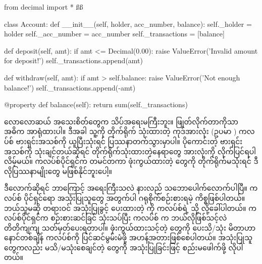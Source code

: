 %
\begin{py} 
from decimal import * ß\label{ch09:txntobal}ß

class Account:
    def __init__(self, holder, acc_number, balance):
        self._holder = holder
        self._acc_number = acc_number
        self._transactions = [balance]

    def deposit(self, amt):
        if amt <= Decimal(0.00):
            raise ValueError('Invalid amount for deposit!')
        self._transactions.append(amt)

    def withdraw(self, amt):
        if amt > self.balance:
            raise ValueError('Not enough balance!')
        self._transactions.append(-amt)

    @property
    def balance(self):
        return sum(self._transactions)
\end{py}
လောလောဆယ် အသေးစိတ်တွေက သိပ်အရေးမကြီးဘူး။  ဖြုတ်လိုက်တာကိုသာ အဓိက အာ\allowbreak ရုံထားပါ။ ဒီအခါ သူ့ကို တိုက်ရိုက် သုံးထားတဲ့ ကုဒ်အားလုံး (ဥပမာ ) ကလပ်စ် ဗားရှင်းအသစ်ကို  ယူပြီးသုံးရင်  ပြဿနာတက်သွားမှာပါ။ ပိုကောင်းတဲ့ ဗားရှင်းအသစ်ကို သုံးချင်တယ်ဆိုရင် တိုက်ရိုက်သုံးထားတဲ့နေရာတွေ အားလုံးကို လိုက်ပြင်ရပါလိမ့်မယ်။ ကလပ်စ်ပိုင်ရှင်က တမင်တကာ ဖုံးကွယ်ထားတဲ့  တွေကို တိုက်ရိုက်မသုံးရင် ဒီလိုပြဿနာမျိုးတွေ မဖြစ်နိုင်ဘူးပေါ့။

ဒီလောက်ဆိုရင်  ဘာကြောင့် အရေးကြီးသလဲ နားလည် သဘောပေါက်လောက်ပါပြီ။ ကလပ်စ် ပိုင်ရှင်ရော အသုံးပြုသူတွေ အတွက်ပါ ဂရုစိုက်စဉ်းစားရမဲ့ ကိစ္စဖြစ်ပါတယ်။ ဘယ်သူမဆို တရားဝင် အသုံးပြုခွင့် ပေးထားတဲ့  ကို  ကလပ်စ်ရဲ့  သို့  လို့ခေါ်ပါတယ်။ ကလပ်စ်ပိုင်ရှင်က စဉ်းစားဆင်ခြင် သုံးသပ်ပြီး ကလပ်စ်  က ဘယ်လိုဖြစ်သင့်လဲ တိတိကျကျ သတ်မှတ်ပေးရတာပါ။ ဖုံးကွယ်ထားသင့်တဲ့  တွေကို ပေးသိ/သုံး မိတာဟာ နောင်တစ်ချိန် ကလပ်စ်ကို ပြင်ဆင်မွမ်းမံဖို့ အဟန့်အတားဖြစ်စေပါတယ်။ အသုံးပြုသူတွေကလည်း မသိ/မသုံးစေချင်တဲ့  တွေကို အသုံးပြုခြင်းဖြင့် စည်းမဖေါက်ဖို့ လိုပါတယ်။ 

